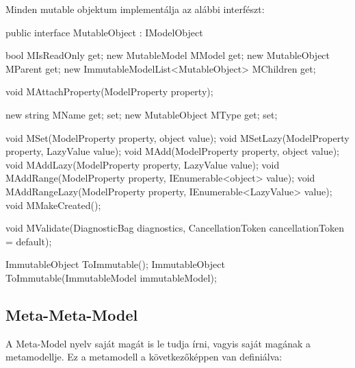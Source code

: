 \documentclass[12pt, a4paper]{report}
\begin{document}
Minden mutable objektum implementálja az alábbi interfészt:
\begin{csharpcode}
public interface MutableObject : IModelObject
{
	bool MIsReadOnly { get; }
	new MutableModel MModel { get; }
	new MutableObject MParent { get; }
	new ImmutableModelList<MutableObject> MChildren { get; }
	
	void MAttachProperty(ModelProperty property);
	
	new string MName { get; set; }
	new MutableObject MType { get; set; }
	
	void MSet(ModelProperty property, object value);
	void MSetLazy(ModelProperty property, LazyValue value);
	void MAdd(ModelProperty property, object value);
	void MAddLazy(ModelProperty property, LazyValue value);
	void MAddRange(ModelProperty property, IEnumerable<object> value);
	void MAddRangeLazy(ModelProperty property, IEnumerable<LazyValue> value);
	void MMakeCreated();
	
	void MValidate(DiagnosticBag diagnostics, CancellationToken cancellationToken = default);
	
	ImmutableObject ToImmutable();
	ImmutableObject ToImmutable(ImmutableModel immutableModel);
}
\end{csharpcode}

\subsection{Meta-Meta-Model}

A Meta-Model nyelv saját magát is le tudja írni, vagyis saját magának a metamodellje. Ez a metamodell a következőképpen van definiálva:
\end{document}
